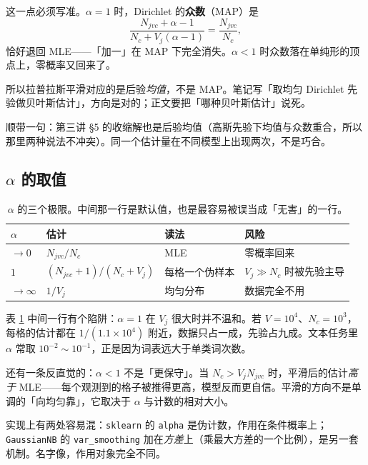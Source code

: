 \documentclass[11pt,a4paper,fontset=windows,zihao=-4]{ctexart}
\newcommand{\tabhead}{\sffamily\bfseries\color{navy}}
\begin{document}
\begin{warn}
这一点必须写准。$\alpha=1$ 时，Dirichlet 的\textbf{众数}（MAP）是
\[
  \frac{N_{jvc}+\alpha-1}{N_c+V_j(\alpha-1)}=\frac{N_{jvc}}{N_c},
\]
恰好退回 MLE——「加一」在 MAP 下完全消失。$\alpha<1$ 时众数落在单纯形的顶点上，零概率又回来了。

所以拉普拉斯平滑对应的是后验\emph{均值}，不是 MAP。笔记写「取均匀 Dirichlet 先验做贝叶斯估计」，方向是对的；正文要把「哪种贝叶斯估计」说死。
\end{warn}

顺带一句：第三讲 §5 的收缩解也是后验均值（高斯先验下均值与众数重合，所以那里两种说法不冲突）。同一个估计量在不同模型上出现两次，不是巧合。

\subsection{$\alpha$ 的取值}

\begin{table}[htbp]
\centering
\small
\begin{tabular}{@{}llll@{}}
\toprule
\rowcolor{navy!7}
\tabhead $\alpha$ & \tabhead 估计 & \tabhead 读法 & \tabhead 风险\\
\midrule
$\to0$ & $N_{jvc}/N_c$ & MLE & 零概率回来\\
$1$ & $(N_{jvc}+1)/(N_c+V_j)$ & 每格一个伪样本 & $V_j\gg N_c$ 时被先验主导\\
$\to\infty$ & $1/V_j$ & 均匀分布 & 数据完全不用\\
\bottomrule
\end{tabular}
\caption{$\alpha$ 的三个极限。中间那一行是默认值，也是最容易被误当成「无害」的一行。}
\label{tab:alpha}
\end{table}

表 \ref{tab:alpha} 中间一行有个陷阱：$\alpha=1$ 在 $V_j$ 很大时并不温和。若 $V=10^4$、$N_c=10^3$，每格的估计都在 $1/(1.1\times10^4)$ 附近，数据只占一成，先验占九成。文本任务里 $\alpha$ 常取 $10^{-2}\sim10^{-1}$，正是因为词表远大于单类词次数。

还有一条反直觉的：$\alpha<1$ 不是「更保守」。当 $N_c>V_jN_{jvc}$ 时，平滑后的估计\emph{高于} MLE——每个观测到的格子被推得更高，模型反而更自信。平滑的方向不是单调的「向均匀靠」，它取决于 $\alpha$ 与计数的相对大小。


实现上有两处容易混：\texttt{sklearn} 的 \texttt{alpha} 是伪计数，作用在条件概率上；\texttt{GaussianNB} 的 \texttt{var\_smoothing} 加在\emph{方差}上（乘最大方差的一个比例），是另一套机制。名字像，作用对象完全不同。
\end{document}
